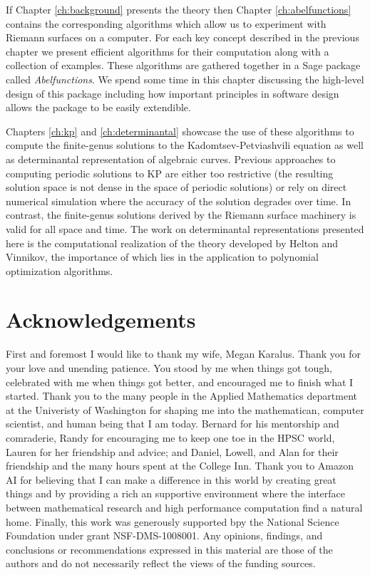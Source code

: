 If Chapter \ref{ch:background} presents the theory then Chapter
\ref{ch:abelfunctions} contains the corresponding algorithms which allow us to
experiment with Riemann surfaces on a computer. For each key concept described
in the previous chapter we present efficient algorithms for their computation
along with a collection of examples. These algorithms are gathered together in a
Sage package called {\it Abelfunctions}. We spend some time in this chapter
discussing the high-level design of this package including how important
principles in software design allows the package to be easily extendible.

Chapters \ref{ch:kp} and \ref{ch:determinantal} showcase the use of these
algorithms to compute the finite-genus solutions to the Kadomtsev-Petviashvili
equation as well as determinantal representation of algebraic curves. Previous
approaches to computing periodic solutions to KP are either too restrictive (the
resulting solution space is not dense in the space of periodic solutions) or
rely on direct numerical simulation where the accuracy of the solution degrades
over time. In contrast, the finite-genus solutions derived by the Riemann
surface machinery is valid for all space and time. The work on determinantal
representations presented here is the computational realization of the theory
developed by Helton and Vinnikov, the importance of which lies in the
application to polynomial optimization algorithms.

\section{Acknowledgements} \label{sec:acknowledgments}

First and foremost I would like to thank my wife, Megan Karalus. Thank you for
your love and unending patience. You stood by me when things got tough,
celebrated with me when things got better, and encouraged me to finish what I
started. Thank you to the many people in the Applied Mathematics department at
the Univeristy of Washington for shaping me into the mathematican, computer
scientist, and human being that I am today. Bernard for his mentorship and
comraderie, Randy for encouraging me to keep one toe in the HPSC world, Lauren
for her friendship and advice; and Daniel, Lowell, and Alan for their friendship
and the many hours spent at the College Inn. Thank you to Amazon AI for
believing that I can make a difference in this world by creating great things
and by providing a rich an supportive environment where the interface between
mathematical research and high performance computation find a natural home.
Finally, this work was generously supported bpy the National Science Foundation
under grant NSF-DMS-1008001. Any opinions, findings, and conclusions or
recommendations expressed in this material are those of the authors and do not
necessarily reflect the views of the funding sources.
